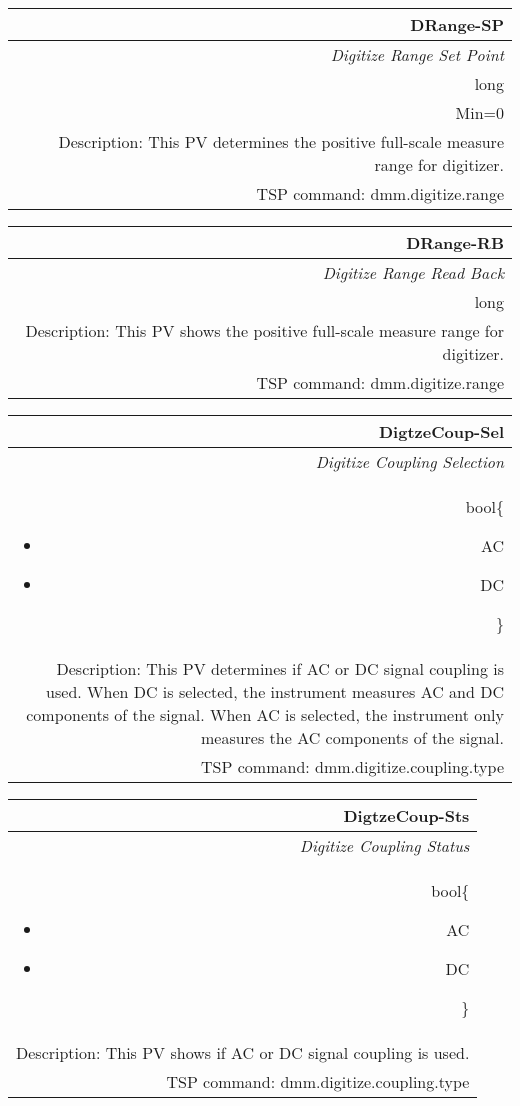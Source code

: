 \documentclass[openany]{article}
\begin{document}
		\begin{tabular}{N}
			\hline
			\bfseries DRange-SP\label{pv:drange-sp} \\ \hline
			\emph{Digitize Range Set Point} \\
			long \\
			Min=0 \\
			Description: This PV determines the positive full-scale measure range for digitizer. \\
			TSP command: dmm.digitize.range
		\end{tabular}

		\begin{tabular}{N}
			\hline
			\bfseries DRange-RB\label{pv:drange-rb} \\ \hline
			\emph{Digitize Range Read Back} \\
			long \\
			Description: This PV shows the positive full-scale measure range for digitizer. \\
			TSP command: dmm.digitize.range
		\end{tabular}

		\begin{tabular}{N}
			\hline
			\bfseries DigtzeCoup-Sel\label{pv:digtzecoup-sel} \\ \hline
			\emph{Digitize Coupling Selection} \\
			bool\{\begin{itemize}[noitemsep]
				\small
				\item[] AC
				\item[] DC
			\end{itemize}\} \\
			Description: This PV determines if AC or DC signal coupling is used. When DC is selected, the instrument measures AC and DC components of the signal. When AC is selected, the instrument only measures the AC components of the signal. \\
			TSP command: dmm.digitize.coupling.type
		\end{tabular}

		\begin{tabular}{N}
			\hline
			\bfseries DigtzeCoup-Sts\label{pv:digtzecoup-sts} \\ \hline
			\emph{Digitize Coupling Status} \\
			bool\{\begin{itemize}[noitemsep]
				\small
				\item[] AC
				\item[] DC
			\end{itemize}\} \\
			Description: This PV shows if AC or DC signal coupling is used. \\
			TSP command: dmm.digitize.coupling.type
		\end{tabular}
\end{document}
